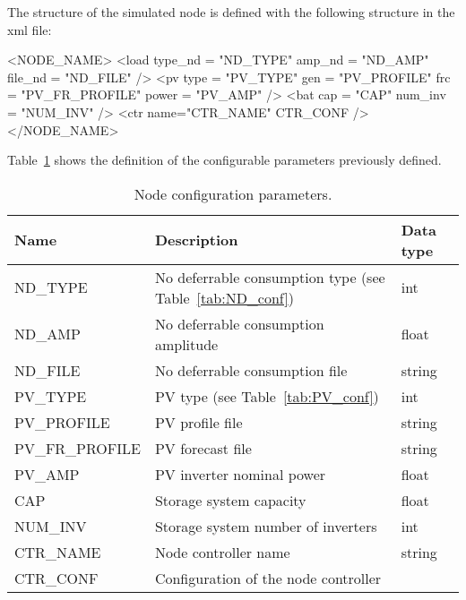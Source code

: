 The structure of the simulated node is defined with the following structure in the xml file:
%
\begin{code}
	<NODE_NAME>
		<load 
			type_nd = "ND_TYPE" 
			amp_nd  = "ND_AMP" 
			file_nd = "ND_FILE" 
		/>
		<pv   
			type  = "PV_TYPE" 
			gen   = "PV_PROFILE" 
			frc   = "PV_FR_PROFILE" 
			power = "PV_AMP"
		/>
		<bat  
			cap     = "CAP" 
			num_inv = "NUM_INV"
		/>
		<ctr  
			name="CTR_NAME" 
			CTR_CONF			
		/>									
	</NODE_NAME>
\end{code}

%
Table~\ref{tab:node_conf} shows the definition of the configurable parameters previously defined. 
%
\begin{table}[h]
	\begin{center}	
	\begin{tabular}{|m{3.5cm}|m{10cm}|m{1cm}|} \hline		
		{\bf Name} 	& {\bf Description} 			   		        & {\bf Data type} 	\\ \hline
		ND\_TYPE	& No deferrable consumption type (see Table~\ref{tab:ND_conf})	& int		 	\\ \hline
		ND\_AMP		& No deferrable consumption amplitude	   			& float			\\ \hline
		ND\_FILE	& No deferrable consumption file	   			& string		\\ \hline
		PV\_TYPE	& PV type (see Table~\ref{tab:PV_conf})	   			& int			\\ \hline
		PV\_PROFILE	& PV profile file			   			& string		\\ \hline
		PV\_FR\_PROFILE	& PV forecast file			   			& string		\\ \hline
		PV\_AMP		& PV inverter nominal power		   			& float			\\ \hline
		CAP		& Storage system capacity		   			& float			\\ \hline
		NUM\_INV	& Storage system number of inverters	   			& int			\\ \hline
		CTR\_NAME	& Node controller name			   			& string		\\ \hline
		CTR\_CONF	& Configuration of the node controller     			& 			\\ \hline	
	\end{tabular}
	\caption{Node configuration parameters.}
	\label{tab:node_conf}
	\end{center}
\end{table}

